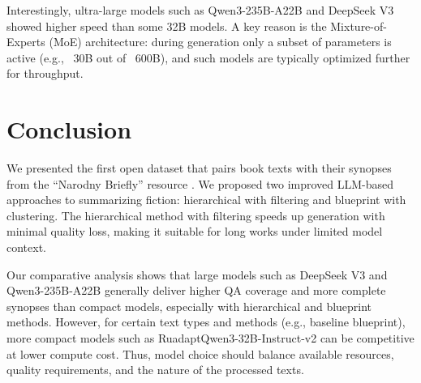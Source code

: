 \documentclass{superfri}
\begin{document}

Interestingly, ultra-large models such as Qwen3-235B-A22B and DeepSeek V3 showed higher speed
than some 32B models.
A key reason is the Mixture-of-Experts (MoE) architecture:
during generation only a subset of parameters is active (e.g., ~30B out of ~600B),
and such models are typically optimized further for throughput.


\section*{Conclusion}
We presented the first open dataset that pairs book texts with their synopses from the “Narodny Briefly” resource \cite{Briefly}.
We proposed two improved LLM-based approaches to summarizing fiction: hierarchical with filtering and blueprint with clustering.
The hierarchical method with filtering speeds up generation with minimal quality loss,
making it suitable for long works under limited model context.

Our comparative analysis shows that large models such as DeepSeek V3 and Qwen3-235B-A22B generally deliver higher QA coverage and
more complete synopses than compact models, especially with hierarchical and blueprint methods.
However, for certain text types and methods (e.g., baseline blueprint), more compact models such as RuadaptQwen3-32B-Instruct-v2
can be competitive at lower compute cost.
Thus, model choice should balance available resources, quality requirements, and the nature of the processed texts.
\end{document}
